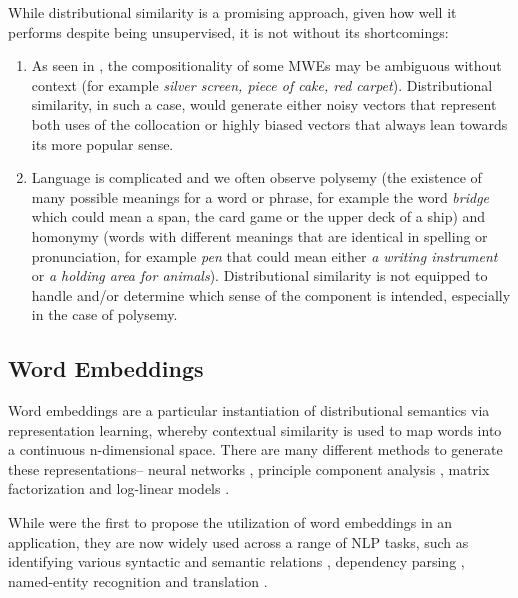 While distributional similarity is a promising approach, given how well it performs despite being unsupervised, it is not without its shortcomings:
\begin{enumerate}
    \item As seen in , the compositionality of some MWEs may be ambiguous without context (for example \textit{silver screen, piece of cake, red carpet}). Distributional similarity, in such a case, would generate either noisy vectors that represent both uses of the collocation or highly biased vectors that always lean towards its more popular sense.
    \item Language is complicated and we often observe polysemy (the existence of many possible meanings for a word or phrase, for example the word \textit{bridge} which could mean a span, the card game or the upper deck of a ship) and homonymy (words with different meanings that are identical in spelling or pronunciation, for example \textit{pen} that could mean either \textit{a writing instrument} or \textit{a holding area for animals}). Distributional similarity is not equipped to handle and/or determine which sense of the component is intended, especially in the case of polysemy.
\end{enumerate}

\subsection{Word Embeddings}
Word embeddings are a particular instantiation of distributional semantics via representation learning, whereby contextual similarity is used to map words into a continuous n-dimensional space. There are many different methods to generate these representations-- neural networks \citep{Bengio2003}, principle component analysis \citep{Lebret2013}, matrix factorization \citep{Jeffrey2014} and log-linear models \citep{Mikolov2013}.

While \cite{Coll2008} were the first to propose the utilization of word embeddings in an application, they are now widely used across a range of NLP tasks, such as identifying various syntactic and semantic relations \citep{Mikolov2013}, dependency parsing \citep{Bansal2014}, named-entity recognition \citep{Passos2014} and translation \citep{Zou2013}.

